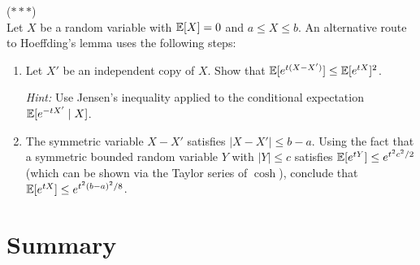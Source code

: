\documentclass[11pt,a4paper]{article}
\begin{document}
\begin{exercise}
\textnormal{(\(\ast\ast\ast\))} \\
Let $X$ be a random variable with $\mathbb{E}[X] = 0$ and $a \leq X \leq b$.
An alternative route to Hoeffding's lemma uses the following steps:
\begin{enumerate}[nosep,label=(\alph*)]
    \item Let $X'$ be an independent copy of $X$. Show that
    $\mathbb{E}[e^{t(X - X')}] \leq \mathbb{E}[e^{tX}]^2$.

    \textit{Hint:} Use Jensen's inequality applied to the conditional
    expectation $\mathbb{E}[e^{-tX'} \mid X]$.
    \item The symmetric variable $X - X'$ satisfies
    $|X - X'| \leq b - a$. Using the fact that a symmetric bounded
    random variable $Y$ with $|Y| \leq c$ satisfies
    $\mathbb{E}[e^{tY}] \leq e^{t^2 c^2 / 2}$ (which can be shown via the
    Taylor series of $\cosh$), conclude that
    $\mathbb{E}[e^{tX}] \leq e^{t^2(b-a)^2/8}$.
\end{enumerate}
\end{exercise}


\section{Summary}
\label{sec:summary}
\end{document}
